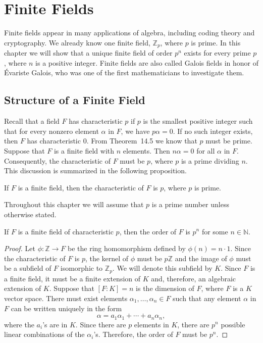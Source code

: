 \chapter{Finite Fields}


Finite fields appear in many applications of algebra, including coding theory and cryptography.  We already know one finite field, ${\mathbb Z}_p$, where $p$ is prime.  In this chapter we will show that a unique finite field of order $p^n$ exists for every prime $p$, where $n$ is a positive integer.  Finite fields are also called Galois fields in honor of \'{E}variste Galois, who was one of the first mathematicians to
investigate them.

 
\section{Structure of a Finite Field}

Recall that a field $F$ has {\bfi characteristic} $p$ if $p$ is the smallest positive integer such that for every nonzero element $\alpha$ in $F$, we have $p \alpha = 0$.  If no such integer exists, then $F$ has characteristic 0.  From Theorem~14.5 we know that $p$ must be prime.  Suppose that $F$ is a finite field with $n$ elements. Then $n \alpha = 0$ for all $\alpha$ in $F$.  Consequently, the characteristic of $F$ must be $p$, where $p$ is a prime dividing $n$.  This discussion is summarized in the following proposition.   

\begin{proposition}
If $F$ is a finite field, then the characteristic of $F$ is $p$, where $p$ is prime.
\end{proposition}

Throughout this chapter we will assume that $p$ is a prime number unless otherwise stated.  

\begin{proposition}
If $F$ is a finite field of characteristic $p$, then the order of $F$ is $p^n$ for some $n \in {\mathbb N}$.   
\end{proposition}

\begin{proof}
Let $\phi : {\mathbb Z} \rightarrow F$ be the ring homomorphism defined by $\phi(n) = n \cdot 1$.  Since the characteristic of $F$ is $p$, the kernel of $\phi$ must be $p {\mathbb Z}$ and the image of $\phi$ must be a subfield of $F$ isomorphic to ${\mathbb Z}_p$.  We will denote this subfield by $K$.  Since $F$ is a finite field, it must be a finite extension of $K$ and, therefore, an algebraic extension of $K$. Suppose that $[F : K] = n$ is the dimension of $F$, where $F$ is a $K$ vector space.  There must exist elements $\alpha_1, \ldots, \alpha_n \in F$ such that any element $\alpha$ in $F$ can be written uniquely in the form   
$$
\alpha = a_1 \alpha_1 + \cdots + a_n \alpha_n,
$$
where the $a_i$'s are in $K$.  Since there are $p$ elements in $K$, there are $p^n$ possible linear combinations of the $\alpha_i$'s.  Therefore, the order of $F$ must be $p^n$.  
\end{proof}


